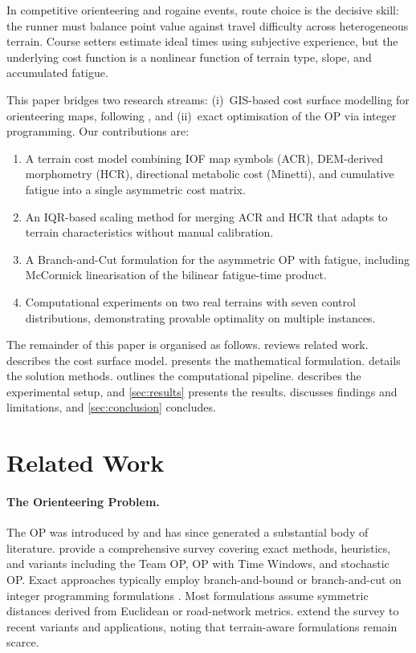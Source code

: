 \documentclass[11pt,a4paper]{article}
\begin{document}
In competitive orienteering and rogaine events, route choice is the decisive skill: the runner must balance point value against travel difficulty across heterogeneous terrain.
Course setters estimate ideal times using subjective experience, but the underlying cost function is a nonlinear function of terrain type, slope, and accumulated fatigue.

This paper bridges two research streams: (i)~GIS-based cost surface modelling for orienteering maps, following \citet{ica2021lcp}, and (ii)~exact optimisation of the OP via integer programming.
Our contributions are:
\begin{enumerate}[nosep]
  \item A terrain cost model combining IOF map symbols (ACR), DEM-derived morphometry (HCR), directional metabolic cost (Minetti), and cumulative fatigue into a single asymmetric cost matrix.
  \item An IQR-based scaling method for merging ACR and HCR that adapts to terrain characteristics without manual calibration.
  \item A Branch-and-Cut formulation for the asymmetric OP with fatigue, including McCormick linearisation of the bilinear fatigue-time product.
  \item Computational experiments on two real terrains with seven control distributions, demonstrating provable optimality on multiple instances.
\end{enumerate}

The remainder of this paper is organised as follows.
 reviews related work.
 describes the cost surface model.
 presents the mathematical formulation.
 details the solution methods.
 outlines the computational pipeline.
 describes the experimental setup, and \cref{sec:results} presents the results.
 discusses findings and limitations, and \cref{sec:conclusion} concludes.

\section{Related Work}
\label{sec:related}

\paragraph{The Orienteering Problem.}
The OP was introduced by \citet{tsiligirides1984heuristic} and has since generated a substantial body of literature.
\citet{vansteenwegen2011orienteering} provide a comprehensive survey covering exact methods, heuristics, and variants including the Team OP, OP with Time Windows, and stochastic OP.
Exact approaches typically employ branch-and-bound or branch-and-cut on integer programming formulations \citep{fischetti1998solving,gendreau1998generalized}.
Most formulations assume symmetric distances derived from Euclidean or road-network metrics.
\citet{gunawan2016orienteering} extend the survey to recent variants and applications, noting that terrain-aware formulations remain scarce.
\end{document}
